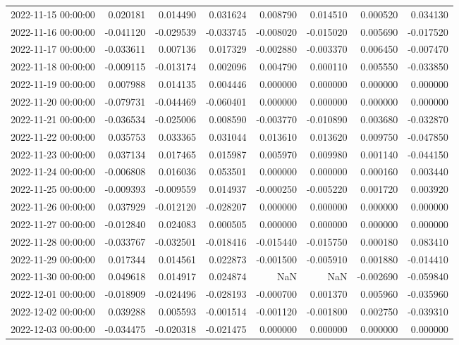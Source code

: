 \begin{tabular}{lrrrrrrr}
2022-11-15 00:00:00 & 0.020181 & 0.014490 & 0.031624 & 0.008790 & 0.014510 & 0.000520 & 0.034130 \\
2022-11-16 00:00:00 & -0.041120 & -0.029539 & -0.033745 & -0.008020 & -0.015020 & 0.005690 & -0.017520 \\
2022-11-17 00:00:00 & -0.033611 & 0.007136 & 0.017329 & -0.002880 & -0.003370 & 0.006450 & -0.007470 \\
2022-11-18 00:00:00 & -0.009115 & -0.013174 & 0.002096 & 0.004790 & 0.000110 & 0.005550 & -0.033850 \\
2022-11-19 00:00:00 & 0.007988 & 0.014135 & 0.004446 & 0.000000 & 0.000000 & 0.000000 & 0.000000 \\
2022-11-20 00:00:00 & -0.079731 & -0.044469 & -0.060401 & 0.000000 & 0.000000 & 0.000000 & 0.000000 \\
2022-11-21 00:00:00 & -0.036534 & -0.025006 & 0.008590 & -0.003770 & -0.010890 & 0.003680 & -0.032870 \\
2022-11-22 00:00:00 & 0.035753 & 0.033365 & 0.031044 & 0.013610 & 0.013620 & 0.009750 & -0.047850 \\
2022-11-23 00:00:00 & 0.037134 & 0.017465 & 0.015987 & 0.005970 & 0.009980 & 0.001140 & -0.044150 \\
2022-11-24 00:00:00 & -0.006808 & 0.016036 & 0.053501 & 0.000000 & 0.000000 & 0.000160 & 0.003440 \\
2022-11-25 00:00:00 & -0.009393 & -0.009559 & 0.014937 & -0.000250 & -0.005220 & 0.001720 & 0.003920 \\
2022-11-26 00:00:00 & 0.037929 & -0.012120 & -0.028207 & 0.000000 & 0.000000 & 0.000000 & 0.000000 \\
2022-11-27 00:00:00 & -0.012840 & 0.024083 & 0.000505 & 0.000000 & 0.000000 & 0.000000 & 0.000000 \\
2022-11-28 00:00:00 & -0.033767 & -0.032501 & -0.018416 & -0.015440 & -0.015750 & 0.000180 & 0.083410 \\
2022-11-29 00:00:00 & 0.017344 & 0.014561 & 0.022873 & -0.001500 & -0.005910 & 0.001880 & -0.014410 \\
2022-11-30 00:00:00 & 0.049618 & 0.014917 & 0.024874 & NaN & NaN & -0.002690 & -0.059840 \\
2022-12-01 00:00:00 & -0.018909 & -0.024496 & -0.028193 & -0.000700 & 0.001370 & 0.005960 & -0.035960 \\
2022-12-02 00:00:00 & 0.039288 & 0.005593 & -0.001514 & -0.001120 & -0.001800 & 0.002750 & -0.039310 \\
2022-12-03 00:00:00 & -0.034475 & -0.020318 & -0.021475 & 0.000000 & 0.000000 & 0.000000 & 0.000000 \\

\end{tabular}
